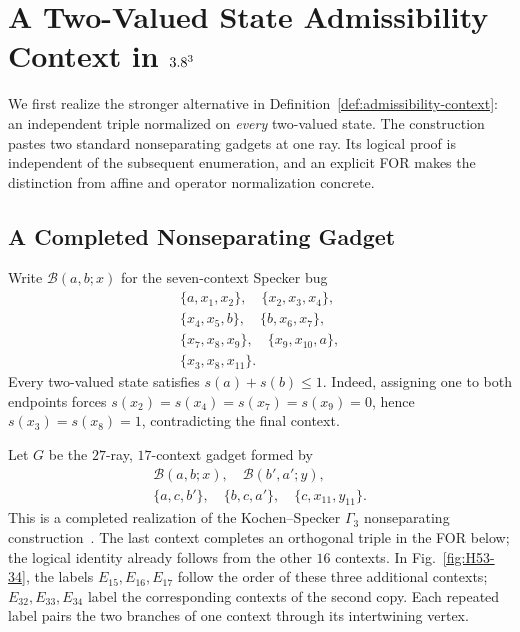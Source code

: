 \documentclass[aps,pra,reprint,superscriptaddress,longbibliography,nofootinbib,floatfix,10pt]{revtex4-2}
\theoremstyle{definition}\newtheorem{definition}[theorem]{Definition}
\theoremstyle{remark}\newtheorem{remark}[theorem]{Remark}
\begin{document}
\section{A Two-Valued State Admissibility Context in \texorpdfstring{$3.8^3$}{R3}}\label{sec:two-valued}

We first realize the stronger alternative in Definition~\ref{def:admissibility-context}: an independent triple normalized on \emph{every} two-valued state. The construction pastes two standard nonseparating gadgets at one ray. Its logical proof is independent of the subsequent enumeration, and an explicit FOR makes the distinction from affine and operator normalization concrete.

\subsection{A Completed Nonseparating Gadget}

Write $\mathcal B(a,b;x)$ for the seven-context Specker bug
\begin{equation}\label{eq:H53-bug}
\begin{gathered}
\{a,x_1,x_2\},\quad\{x_2,x_3,x_4\},\\
\{x_4,x_5,b\},\quad\{b,x_6,x_7\},\\
\{x_7,x_8,x_9\},\quad\{x_9,x_{10},a\},\\
\{x_3,x_8,x_{11}\}.
\end{gathered}
\end{equation}
Every two-valued state satisfies $s(a)+s(b)\le1$. Indeed, assigning one to both endpoints forces $s(x_2)=s(x_4)=s(x_7)=s(x_9)=0$, hence $s(x_3)=s(x_8)=1$, contradicting the final context.

Let $G$ be the $27$-ray, $17$-context gadget formed by
\begin{equation}\label{eq:H53-G}
\begin{gathered}
\mathcal B(a,b;x),\quad\mathcal B(b',a';y),\\
\{a,c,b'\},\quad\{b,c,a'\},\quad\{c,x_{11},y_{11}\}.
\end{gathered}
\end{equation}
This is a completed realization of the Kochen--Specker $\Gamma_3$ nonseparating construction~\cite{kochen1,svozil-2018-whycontexts}. The last context completes an orthogonal triple in the FOR below; the logical identity already follows from the other $16$ contexts. In Fig.~\ref{fig:H53-34}, the labels $E_{15},E_{16},E_{17}$ follow the order of these three additional contexts; $E_{32},E_{33},E_{34}$ label the corresponding contexts of the second copy. Each repeated label pairs the two branches of one context through its intertwining vertex.
\end{document}
